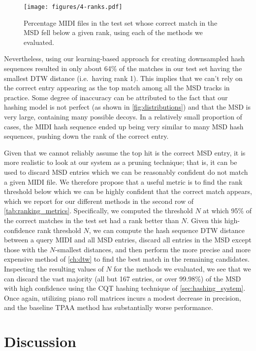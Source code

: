 \begin{figure}
  \texttt{[image: figures/4-ranks.pdf]}
  \caption[Percentage of the test set below a given rank]{Percentage MIDI files in the test set whose correct match in the MSD fell below a given rank, using each of the methods we evaluated.}
  \label{fig:ranks}
\end{figure}

Nevertheless, using our learning-based approach for creating downsampled hash sequences resulted in only about 64\% of the matches in our test set having the smallest DTW distance (i.e.\ having rank 1).
This implies that we can't rely on the correct entry appearing as the top match among all the MSD tracks in practice.
Some degree of inaccuracy can be attributed to the fact that our hashing model is not perfect (as shown in \cref{fig:distributions}) and that the MSD is very large, containing many possible decoys.
In a relatively small proportion of cases, the MIDI hash sequence ended up being very similar to many MSD hash sequences, pushing down the rank of the correct entry.

Given that we cannot reliably assume the top hit is the correct MSD entry, it is more realistic to look at our system as a pruning technique; that is, it can be used to discard MSD entries which we can be reasonably confident do not match a given MIDI file.
We therefore propose that a useful metric is to find the rank threshold below which we can be highly confident that the correct match appears, which we report for our different methods in the second row of \cref{tab:ranking_metrics}.
Specifically, we computed the threshold $N$ at which 95\% of the correct matches in the test set had a rank better than $N$.
Given this high-confidence rank threshold $N$, we can compute the hash sequence DTW distance between a query MIDI and all MSD entries, discard all entries in the MSD except those with the $N$-smallest distances, and then perform the more precise and more expensive method of \cref{ch:dtw} to find the best match in the remaining candidates.
Inspecting the resulting values of $N$ for the methods we evaluated, we see that we can discard the vast majority (all but 167 entries, or over 99.98\%) of the MSD with high confidence using the CQT hashing technique of \cref{sec:hashing_system}.
Once again, utilizing piano roll matrices incurs a modest decrease in precision, and the baseline TPAA method has substantially worse performance.

\section{Discussion}
\label{sec:dhs_discussion}


